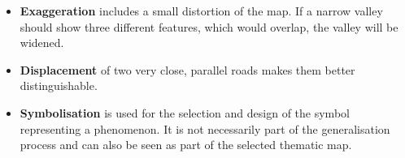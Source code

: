 \begin{itemize}
\item \textbf{Exaggeration} includes a small distortion of the map. If a narrow valley should show three different features, which would overlap, the valley will be widened.

\item \textbf{Displacement} of two very close, parallel roads makes them better distinguishable.

\item \textbf{Symbolisation} is used for the selection and design of the symbol representing a phenomenon. It is not necessarily part of the generalisation process and can also be seen as part of the selected thematic map.

\end{itemize}